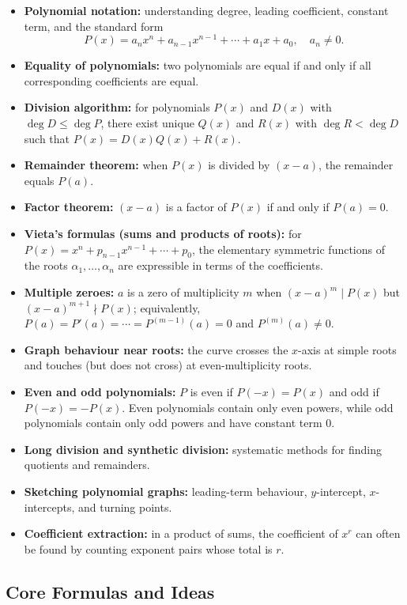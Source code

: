 \documentclass[12pt]{article}
\begin{document}
\begin{itemize}[leftmargin=*]
  \item \textbf{Polynomial notation:} understanding degree, leading coefficient, constant term, and the standard form
  \[
    P(x) = a_n x^n + a_{n-1}x^{n-1} + \cdots + a_1 x + a_0, \quad a_n \neq 0.
  \]
  \item \textbf{Equality of polynomials:} two polynomials are equal if and only if all corresponding coefficients are equal.
  \item \textbf{Division algorithm:} for polynomials $P(x)$ and $D(x)$ with $\deg D \leq \deg P$, there exist unique $Q(x)$ and $R(x)$ with $\deg R < \deg D$ such that $P(x) = D(x)Q(x) + R(x)$.
  \item \textbf{Remainder theorem:} when $P(x)$ is divided by $(x-a)$, the remainder equals $P(a)$.
  \item \textbf{Factor theorem:} $(x-a)$ is a factor of $P(x)$ if and only if $P(a) = 0$.
  \item \textbf{Vieta's formulas (sums and products of roots):} for $P(x) = x^n + p_{n-1}x^{n-1} + \cdots + p_0$, the elementary symmetric functions of the roots $\alpha_1, \ldots, \alpha_n$ are expressible in terms of the coefficients.
  \item \textbf{Multiple zeroes:} $a$ is a zero of multiplicity $m$ when $(x-a)^m \mid P(x)$ but $(x-a)^{m+1} \nmid P(x)$; equivalently, $P(a) = P'(a) = \cdots = P^{(m-1)}(a) = 0$ and $P^{(m)}(a) \neq 0$.
  \item \textbf{Graph behaviour near roots:} the curve crosses the $x$-axis at simple roots and touches (but does not cross) at even-multiplicity roots.
  \item \textbf{Even and odd polynomials:} $P$ is even if $P(-x)=P(x)$ and odd if $P(-x)=-P(x)$. Even polynomials contain only even powers, while odd polynomials contain only odd powers and have constant term $0$.
  \item \textbf{Long division and synthetic division:} systematic methods for finding quotients and remainders.
  \item \textbf{Sketching polynomial graphs:} leading-term behaviour, $y$-intercept, $x$-intercepts, and turning points.
  \item \textbf{Coefficient extraction:} in a product of sums, the coefficient of $x^r$ can often be found by counting exponent pairs whose total is $r$.
\end{itemize}

\subsection{Core Formulas and Ideas}
\end{document}

